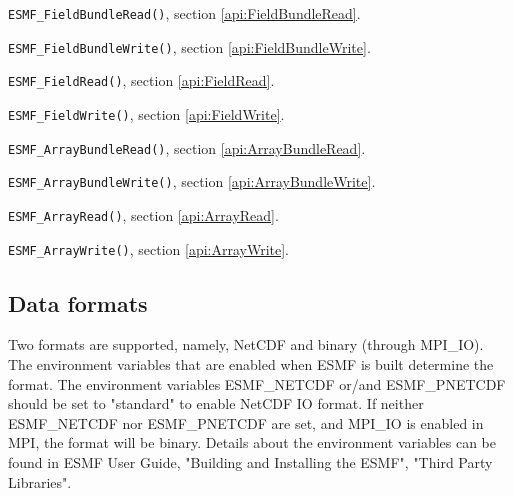 \begin{description}
\item {\tt ESMF\_FieldBundleRead()}, section \ref{api:FieldBundleRead}.
\item {\tt ESMF\_FieldBundleWrite()}, section \ref{api:FieldBundleWrite}.
\item {\tt ESMF\_FieldRead()}, section \ref{api:FieldRead}.
\item {\tt ESMF\_FieldWrite()}, section \ref{api:FieldWrite}.
\item {\tt ESMF\_ArrayBundleRead()}, section \ref{api:ArrayBundleRead}.
\item {\tt ESMF\_ArrayBundleWrite()}, section \ref{api:ArrayBundleWrite}.
\item {\tt ESMF\_ArrayRead()}, section \ref{api:ArrayRead}.
\item {\tt ESMF\_ArrayWrite()}, section \ref{api:ArrayWrite}.
\end{description}


\subsection{Data formats}

Two formats are supported, namely, NetCDF and binary (through MPI\_IO). 
The environment variables that are enabled when ESMF is built determine the 
format.  The environment variables ESMF\_NETCDF or/and ESMF\_PNETCDF should be 
set to "standard" to enable NetCDF IO format.  If neither ESMF\_NETCDF nor 
ESMF\_PNETCDF are set, and MPI\_IO is enabled in MPI, the format will be 
binary.  Details about the environment variables can be found in ESMF User 
Guide, "Building and Installing the ESMF", "Third Party Libraries".

